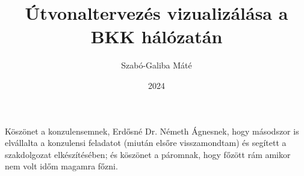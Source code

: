 \documentclass[
]{elteikthesis}[2024/04/26]
\title{Útvonaltervezés vizualizálása a BKK hálózatán} %
\date{2024} %
\author{Szabó-Galiba Máté}
\affiliation{Egyetemi adjunktus} %
\begin{document}


\maketitle
%

\tableofcontents
\cleardoublepage


\cleardoublepage


\cleardoublepage


\cleardoublepage


\cleardoublepage

\chapter*{\acklabel}
Köszönet a konzulensemnek, Erdősné Dr. Németh Ágnesnek, hogy másodszor is elvállalta a konzulensi feladatot (miután elsőre visszamondtam) és segített a szakdolgozat elkészítésében; és köszönet a páromnak, hogy főzött rám amikor nem volt időm magamra főzni.

{}
\printbibliography[title=\biblabel]
\cleardoublepage

{}
\listoffigures
\cleardoublepage

{}
\listoftables
\cleardoublepage


{}
\lstlistoflistings
\cleardoublepage

\end{document}
